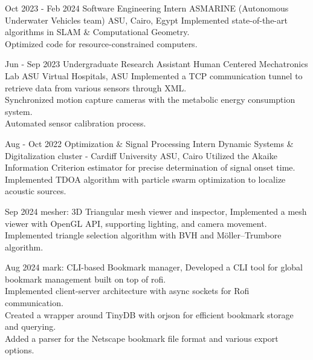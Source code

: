 \documentclass[]{report}
\begin{document}
\vspace{4mm}


\entry
    {Oct 2023 - Feb 2024}
    {Software Engineering Intern}
    {ASMARINE (Autonomous Underwater Vehicles team)}
    {ASU, Cairo, Egypt}
    {
      \tb Implemented state-of-the-art algorithms in SLAM \& Computational Geometry. \\
      \tb Optimized code for resource-constrained computers.
    }

\entry
    {Jun - Sep 2023}
    {Undergraduate Research Assistant}
    {Human Centered Mechatronics Lab}
    {ASU Virtual Hospitals, ASU}
    {
      \tb Implemented a TCP communication tunnel to retrieve data from various sensors through XML. \\
      \tb Synchronized motion capture cameras with the metabolic energy consumption system. \\
      \tb Automated sensor calibration process.
    }

\entry
    {Aug - Oct 2022}
    {Optimization \& Signal Processing Intern}
    {Dynamic Systems \& Digitalization cluster - Cardiff University}
    {ASU, Cairo}
    {
      \tb Utilized the Akaike Information Criterion estimator for precise determination of signal onset time.\\
      \tb Implemented TDOA algorithm with particle swarm optimization to localize acoustic sources.
    }



\entry
    {Sep 2024}
    {mesher: 3D Triangular mesh viewer and inspector, }
    {}{}
    {
        \tb Implemented a mesh viewer with OpenGL API, supporting lighting, and camera movement.\\
        \tb Implemented triangle selection algorithm with BVH and Möller–Trumbore algorithm.
    }

\entry
    {Aug 2024}
    {mark: CLI-based Bookmark manager, }
    {} {}
    {
        \tb Developed a CLI tool for global bookmark management built on top of rofi.\\ 
        \tb Implemented client-server architecture with async sockets for Rofi communication.\\
        \tb Created a wrapper around TinyDB with orjson for efficient bookmark storage and querying.\\ 
        \tb Added a parser for the Netscape bookmark file format and various export options.
    }
\end{document}
